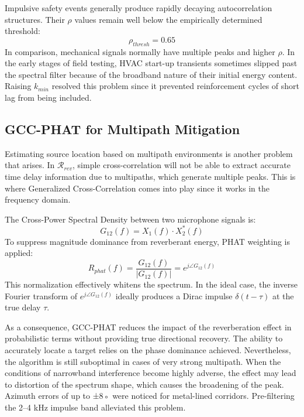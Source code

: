 \documentclass[conference]{IEEEtran}
\begin{document}
Impulsive safety events generally produce rapidly decaying autocorrelation structures. Their $\rho$ values remain well below the empirically determined threshold:
\begin{equation}
\rho_{thresh} = 0.65
\end{equation}
In comparison, mechanical signals normally have multiple peaks and higher $\rho$. In the early stages of field testing, HVAC start-up transients sometimes slipped past the spectral filter because of the broadband nature of their initial energy content. Raising $k_{min}$ resolved this problem since it prevented reinforcement cycles of short lag from being included.

\subsection{GCC-PHAT for Multipath Mitigation}

Estimating source location based on multipath environments is another problem that arises. In $\mathcal{R}_{rev}$, simple cross-correlation will not be able to extract accurate time delay information due to multipaths, which generate multiple peaks. This is where Generalized Cross-Correlation comes into play since it works in the frequency domain.

The Cross-Power Spectral Density between two microphone signals is:
\begin{equation}
G_{12}(f) = X_1(f) \cdot X_2^*(f)
\end{equation}
To suppress magnitude dominance from reverberant energy, PHAT weighting is applied:
\begin{equation}
R_{phat}(f) = \frac{G_{12}(f)}{|G_{12}(f)|} = e^{j\angle G_{12}(f)}
\end{equation}
This normalization effectively whitens the spectrum. In the ideal case, the inverse Fourier transform of $e^{j\angle G_{12}(f)}$ ideally produces a Dirac impulse $\delta(t - \tau)$ at the true delay $\tau$.

As a consequence, GCC-PHAT reduces the impact of the reverberation effect in probabilistic terms without providing true directional recovery. The ability to accurately locate a target relies on the phase dominance achieved. Nevertheless, the algorithm is still suboptimal in cases of very strong multipath. When the conditions of narrowband interference become highly adverse, the effect may lead to distortion of the spectrum shape, which causes the broadening of the peak. Azimuth errors of up to ±8◦ were noticed for metal-lined corridors. Pre-filtering the 2–4 kHz impulse band alleviated this problem.
\end{document}
